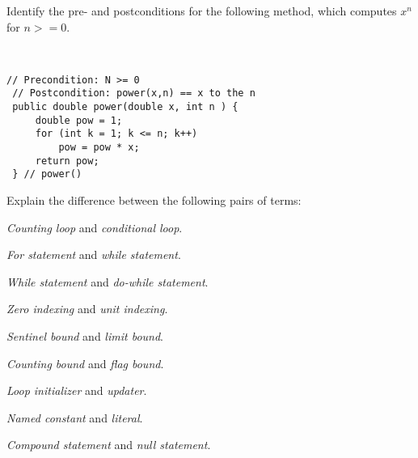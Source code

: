 \begin{ANS}
\item  Identify the pre- and postconditions for the following method, which
computes $x^n$ for $n >= 0$.

\mbox{ }
\begin{jjjlisting}
\begin{lstlisting}[basicstyle=\scriptsize]
 // Precondition: N >= 0
 // Postcondition: power(x,n) == x to the n
 public double power(double x, int n ) {
     double pow = 1;
     for (int k = 1; k <= n; k++)
         pow = pow * x;
     return pow;
 } // power()
\end{lstlisting}
\end{jjjlisting}
\end{ANS}

\label{exercises}

\begin{EXRtwo}

\item  Explain the difference between the following pairs of terms:
\begin{EXRtwoLL}
\item  {\it Counting loop} and {\it conditional loop}.
\item  {\it For statement} and {\it while statement}.
\item  {\it While statement} and {\it do-while statement}.
\item  {\it Zero indexing} and {\it unit indexing}.
\item  {\it Sentinel bound} and {\it limit bound}.
\item  {\it Counting bound} and {\it flag bound}.
\item  {\it Loop initializer} and {\it updater}.
\item  {\it Named constant} and {\it literal}.
\item  {\it Compound statement} and {\it null statement}.
\end{EXRtwoLL}


\end{EXRtwo}
